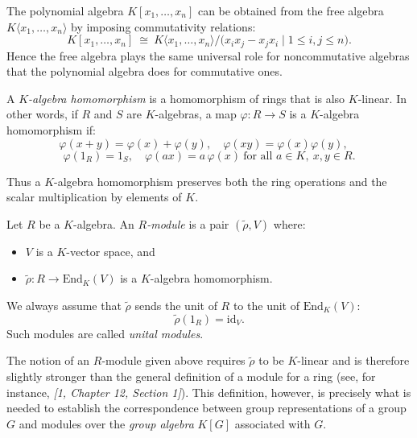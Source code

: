 \begin{remark}
The polynomial algebra $K[x_1,\dots,x_n]$ can be obtained from the free algebra $K\langle x_1,\dots,x_n\rangle$ by imposing commutativity relations:
\[
K[x_1,\dots,x_n]\ \cong\ K\langle x_1,\dots,x_n\rangle/\bigl(x_ix_j-x_jx_i\mid 1\le i,j\le n\bigr).
\]
Hence the free algebra plays the same universal role for noncommutative algebras that the polynomial algebra does for commutative ones.
\end{remark}

\begin{definition}
A \emph{$K$-algebra homomorphism} is a homomorphism of rings that is also $K$-linear.  
In other words, if $R$ and $S$ are $K$-algebras, a map $\varphi:R\to S$ is a $K$-algebra homomorphism if:
\[
\varphi(x+y)=\varphi(x)+\varphi(y),\quad
\varphi(xy)=\varphi(x)\varphi(y),\quad
\]
\[
\varphi(1_R)=1_S,\quad
\varphi(a x)=a\,\varphi(x)\ \text{for all }a\in K,\ x,y\in R.
\]
\end{definition}

\begin{remark}
Thus a $K$-algebra homomorphism preserves both the ring operations and the scalar multiplication by elements of $K$.
\end{remark}

\begin{definition}\label{def:module_K-algebra}
Let $R$ be a $K$-algebra.  
An \emph{$R$-module} is a pair $(\tilde{\rho},V)$ where:
\begin{itemize}
    \item $V$ is a $K$-vector space, and
    \item $\tilde{\rho}:R\to \mathrm{End}_K(V)$ is a $K$-algebra homomorphism.
\end{itemize}
We always assume that $\tilde{\rho}$ sends the unit of $R$ to the unit of $\mathrm{End}_K(V)$:
\[
\tilde{\rho}(1_R)=\mathrm{id}_V.
\]
Such modules are called \emph{unital modules}.
\end{definition}

\begin{remark}
The notion of an $R$-module given above requires $\tilde{\rho}$ to be $K$-linear and is therefore slightly stronger than the general definition of a module for a ring (see, for instance, \emph{[1, Chapter 12, Section 1]}).  
This definition, however, is precisely what is needed to establish the correspondence between group representations of a group $G$ and modules over the \emph{group algebra} $K[G]$ associated with $G$.
\end{remark}

